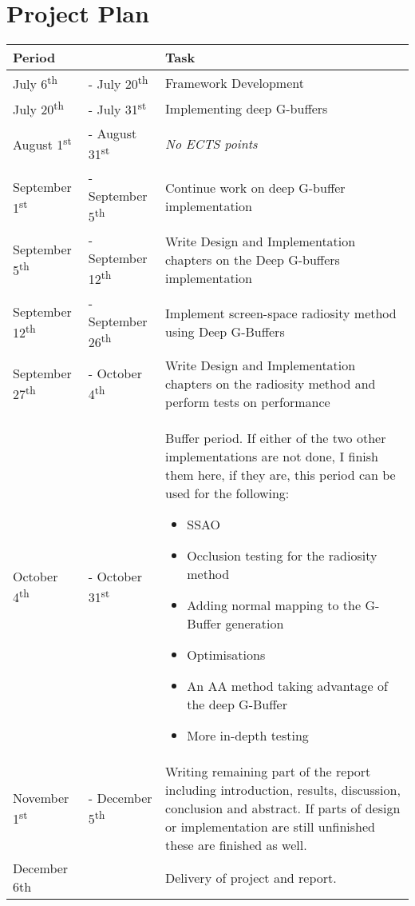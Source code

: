 \documentclass[a4paper]{article}
\begin{document}
\section{Project Plan}
\begin{tabular}{|l l|p{8cm}|}
\hline
\textbf{Period} & & \textbf{Task} \\
\hline

\hline
July 6\textsuperscript{th} & - July 20\textsuperscript{th} & Framework Development \\
\hline
July 20\textsuperscript{th} & - July 31\textsuperscript{st} & Implementing deep G-buffers \\
\hline
August 1\textsuperscript{st} & - August 31\textsuperscript{st} & \emph{No ECTS points} \\
\hline
September 1\textsuperscript{st} & - September 5\textsuperscript{th} & Continue work on deep G-buffer implementation \\
\hline
September 5\textsuperscript{th} & - September 12\textsuperscript{th} & Write Design and Implementation chapters on the Deep G-buffers implementation \\
\hline
September 12\textsuperscript{th} & - September 26\textsuperscript{th} & Implement screen-space radiosity method using Deep G-Buffers \\
\hline
September 27\textsuperscript{th} & - October 4\textsuperscript{th} & Write Design and Implementation chapters on the radiosity method and perform tests on performance \\
\hline
October 4\textsuperscript{th} & - October 31\textsuperscript{st} & Buffer period. If either of the two other implementations are not done, I finish them here, if they are, this period can be used for the following:
\begin{itemize}
\item SSAO
\item Occlusion testing for the radiosity method
\item Adding normal mapping to the G-Buffer generation
\item Optimisations
\item An AA method taking advantage of the deep G-Buffer
\item More in-depth testing
\end{itemize} \\
\hline
November 1\textsuperscript{st} & - December 5\textsuperscript{th} & Writing remaining part of the report including introduction, results, discussion, conclusion and abstract. If parts of design or implementation are still unfinished these are finished as well. \\
\hline
December 6th & & Delivery of project and report. \\
\hline
\end{tabular}
\end{document}
